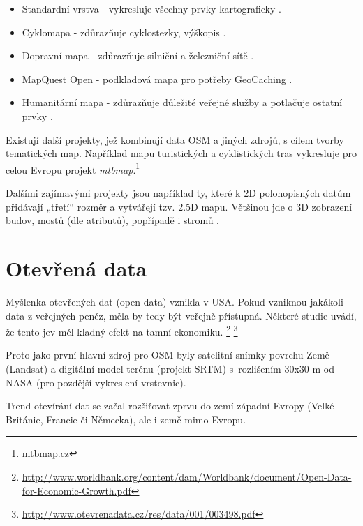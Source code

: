 \begin{itemize}
  \item Standardní vrstva - vykresluje všechny prvky kartograficky  .
  \item Cyklomapa - zdůrazňuje cyklostezky, výškopis .
  \item Dopravní mapa - zdůrazňuje silniční a železniční sítě .
  \item MapQuest Open - podkladová mapa pro potřeby GeoCaching .
  \item Humanitární mapa - zdůrazňuje důležité veřejné služby a potlačuje ostatní prvky . 
\end{itemize}

Existují další projekty, jež kombinují data OSM a jiných zdrojů, s cílem tvorby tematických map.
Například mapu turistických a cyklistických tras vykresluje
pro celou Evropu projekt \textit{mtbmap}.\footnote{mtbmap.cz}

Dalšími zajímavými projekty jsou například ty, které k 2D polohopisných datům přidávají „třetí“ rozměr a
vytvářejí tzv. 2.5D mapu. Většinou jde o 3D zobrazení budov, mostů (dle
atributů), popřípadě i stromů .


\section{Otevřená data}
\label{opendata}

Myšlenka otevřených dat (open data) vznikla v USA.
Pokud vzniknou jakákoli data z veřejných peněz, měla by tedy být
veřejně přístupná. Některé studie uvádí, že tento jev měl kladný efekt na tamní ekonomiku.
\footnote{\url{http://www.worldbank.org/content/dam/Worldbank/document/Open-Data-for-Economic-Growth.pdf}}
\footnote{\url{http://www.otevrenadata.cz/res/data/001/003498.pdf}}

Proto jako první hlavní zdroj pro OSM byly satelitní snímky povrchu Země (Landsat) 
a digitální model terénu (projekt SRTM)
s~rozlišením 30x30 m od NASA (pro pozdější vykreslení vrstevnic).

Trend otevírání dat se začal rozšiřovat zprvu do zemí západní Evropy
(Velké Británie, Francie či Německa), ale i země mimo Evropu.\cite{OpendataTrends}


